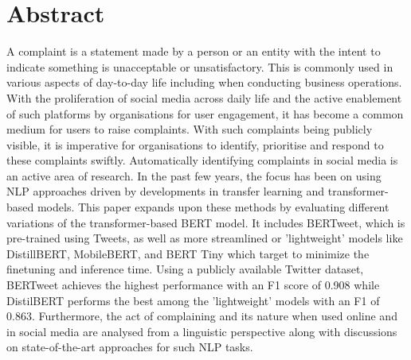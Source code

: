 \chapter*{\Large \center Abstract}

A complaint is a statement made by a person or an entity with the intent to indicate something is unacceptable or unsatisfactory. This is commonly used in various aspects of day-to-day life including when conducting business operations. With the proliferation of social media across daily life and the active enablement of such platforms by organisations for user engagement, it has become a common medium for users to raise complaints. With such complaints being publicly visible, it is imperative for organisations to identify, prioritise and respond to these complaints swiftly. Automatically identifying complaints in social media is an active area of research. In the past few years, the focus has been on using NLP approaches driven by developments in transfer learning and transformer-based models.
\newline \newline
This paper expands upon these methods by evaluating different variations of the transformer-based BERT model. It includes BERTweet, which is pre-trained using Tweets, as well as more streamlined or 'lightweight' models like DistillBERT, MobileBERT, and BERT Tiny which target to minimize the finetuning and inference time. Using a publicly available Twitter dataset, BERTweet achieves the highest performance with an F1 score of 0.908 while DistilBERT performs the best among the 'lightweight' models with an F1 of 0.863. Furthermore, the act of complaining and its nature when used online and in social media are analysed from a linguistic perspective along with discussions on state-of-the-art approaches for such NLP tasks.
\newline \newline
